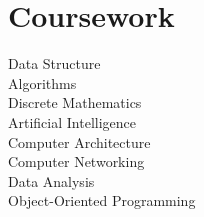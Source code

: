 \section{Coursework}
Data Structure \\
Algorithms \\
Discrete Mathematics \\
Artificial Intelligence \\
Computer Architecture \\
Computer Networking \\
Data Analysis \\
Object-Oriented Programming\\
\sectionsep
